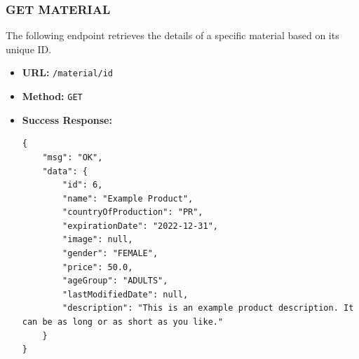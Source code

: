 \subsubsection*{GET MATERIAL}
The following endpoint retrieves the details of a specific material based on its unique ID. 
\begin{itemize}
    \item \textbf{URL:}
    \newline \hspace*{1cm} \texttt{/material/{id}}  
    \item \textbf{Method:}
    \newline \hspace*{1cm}\texttt{GET}
    \item \textbf{Success Response:}
\begin{lstlisting}[breaklines]
{
    "msg": "OK",
    "data": {
        "id": 6,
        "name": "Example Product",
        "countryOfProduction": "PR",
        "expirationDate": "2022-12-31",
        "image": null,
        "gender": "FEMALE",
        "price": 50.0,
        "ageGroup": "ADULTS",
        "lastModifiedDate": null,
        "description": "This is an example product description. It can be as long or as short as you like."
    }
}
\end{lstlisting}
\end{itemize}

